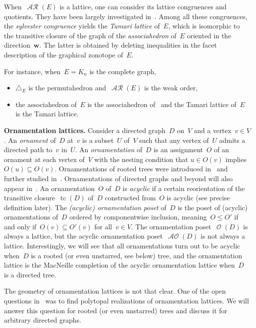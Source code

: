\documentclass{amsart}
\theoremstyle{definition}
\renewcommand{\b}[1]{\boldsymbol{#1}} %
\renewcommand{\c}[1]{\mathcal{#1}} %
\newcommand{\simplex}{\triangle} %
\DeclareMathOperator{\tc}{tc} %
\newcommand{\para}[1]{\bigskip\noindent\textbf{#1}} %
\newcommand{\darkblue}{\color{darkblue}} %
\newcommand{\defn}[1]{\textsl{\darkblue #1}} %
\DeclareMathOperator{\Orn}{\c{O}}  %
\DeclareMathOperator{\AOrn}{\c{AO}}  %
\DeclareMathOperator{\AReori}{\c{AR}}  %
\begin{document}
When~$\AReori(E)$ is a lattice, one can consider its lattice congruences and quotients.
They have been largely investigated in~\cite{Pilaud-acyclicReorientationLattices}.
Among all these congruences, the \defn{sylvester congruence} yields the \defn{Tamari lattice} of~$E$, which is isomorphic to the transitive closure of the graph of the \defn{associahedron} of~$E$ oriented in the direction~$\b{w}$.
The latter is obtained by deleting inequalities in the facet description of the graphical zonotope of~$E$.

For instance, when~$E = K_n$ is the complete graph,
\begin{itemize}
\item $\simplex_E$ is the permutahedron and~$\AReori(E)$ is the weak order,
\item the associahedron of~$E$ is the associahedron of~\cite{ShniderSternberg,Loday} and the Tamari lattice of~$E$ is the Tamari lattice.
\end{itemize}


\para{Ornamentation lattices.}
Consider a directed graph~$D$ on~$V$ and a vertex~$v \in V$.
An \defn{ornament} of~$D$ at~$v$ is a subset~$U$ of~$V$ such that any vertex of~$U$ admits a directed path to~$v$ in~$U$.
An \defn{ornamentation} of~$D$ is an assignment~$O$ of an ornament at each vertex of~$V$ with the nesting condition that $u \in O(v)$ implies~$O(u) \subseteq O(v)$.
Ornamentations of rooted trees were introduced in~\cite{DefantSack} and further studied in~\cite{ajran2025pop}.
Ornamentations of directed graphs and beyond will also appear in~\cite{Sack}.
An ornamentation~$O$ of~$D$ is \defn{acyclic} if a certain reorientation of the transitive closure~$\tc(D)$ of~$D$ constructed from~$O$ is acyclic (see precise definition later).
The \defn{(acyclic) ornamentation poset} of~$D$ is the poset of (acyclic) ornamentations of~$D$ ordered by componentwise inclusion, meaning~$O \le O'$ if and only if~${O(v) \subseteq O'(v)}$ for all~$v \in V$.
The ornamentation poset~$\Orn(D)$ is always a lattice, but the acyclic ornamentation poset~$\AOrn(D)$ is not always a lattice.
Interestingly, we will see that all ornamentations turn out to be acyclic when~$D$ is a rooted (or even unstarred, see below) tree, and the ornamentation lattice is the MacNeille completion of the acyclic ornamentation lattice when~$D$ is a directed tree.

The geometry of ornamentation lattices is not that clear.
One of the open questions in~\cite{DefantSack} was to find polytopal realizations of ornamentation lattices.
We will answer this question for rooted (or even unstarred) trees and discuss it for arbitrary directed graphs.
\end{document}
